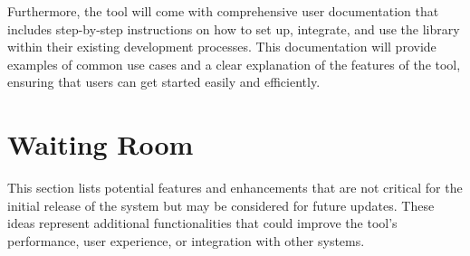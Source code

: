 \documentclass[12pt]{article}
\begin{document}
Furthermore, the tool will come with comprehensive user documentation that includes step-by-step 
instructions on how to set up, integrate, and use the library within their existing development 
processes. This documentation will provide examples of common use cases and a clear explanation of 
the features of the tool, ensuring that users can get started easily and efficiently.

\section{Waiting Room}

This section lists potential features and enhancements that are not
critical for the initial release of the system but may be considered
for future updates. These ideas represent additional functionalities
that could improve the tool’s performance, user experience, or
integration with other systems.
\end{document}
